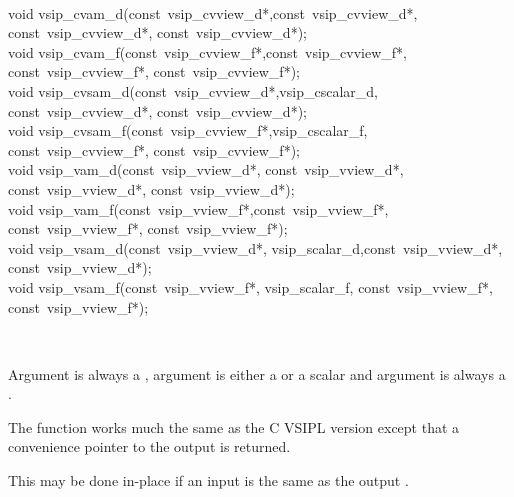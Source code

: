 \\\cvsiplh
\begin{cfuncs}
void vsip\_cvam\_d(const~vsip\_cvview\_d*,const~vsip\_cvview\_d*, const~vsip\_cvview\_d*, const~vsip\_cvview\_d*);\Bs\\
void vsip\_cvam\_f(const~vsip\_cvview\_f*,const~vsip\_cvview\_f*, const~vsip\_cvview\_f*, const~vsip\_cvview\_f*);\Bs\\
void vsip\_cvsam\_d(const~vsip\_cvview\_d*,vsip\_cscalar\_d, const~vsip\_cvview\_d*, const~vsip\_cvview\_d*);\Bs\\
void vsip\_cvsam\_f(const~vsip\_cvview\_f*,vsip\_cscalar\_f, const~vsip\_cvview\_f*, const~vsip\_cvview\_f*);\Bs\\
void vsip\_vam\_d(const~vsip\_vview\_d*, const~vsip\_vview\_d*, const~vsip\_vview\_d*, const~vsip\_vview\_d*);\Bs\\
void vsip\_vam\_f(const~vsip\_vview\_f*,const~vsip\_vview\_f*, const~vsip\_vview\_f*, const~vsip\_vview\_f*);\Bs\\
void vsip\_vsam\_d(const~vsip\_vview\_d*, vsip\_scalar\_d,const~vsip\_vview\_d*, const~vsip\_vview\_d*);\Bs\\
void vsip\_vsam\_f(const~vsip\_vview\_f*, vsip\_scalar\_f,  const~vsip\_vview\_f*, const~vsip\_vview\_f*);\Bs\\
\end{cfuncs}
\\\pyjvsiph
{}
\begin{comments}
\item{Argument  is always a , argument  is either a  or a scalar and argument  is always a .}
\item{The  function works much the same as the C VSIPL version except that a convenience pointer to the output  is returned.}
\item{This may be done in-place if an input  is the same as the output .}
\end{comments}